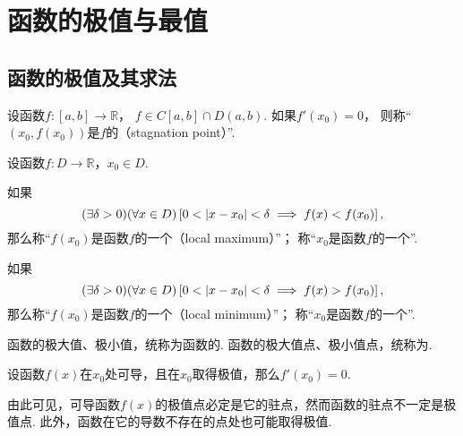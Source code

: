 \section{函数的极值与最值}
\subsection{函数的极值及其求法}
\begin{definition}[驻点]
设函数\(f\colon[a,b]\to\mathbb{R}\)，
\(f \in C[a,b] \cap D(a,b)\).
如果\(f'(x_0)=0\)，
则称“\((x_0,f(x_0))\)是\(f\)的（stagnation point）”.
\end{definition}

\begin{definition}[极值点]
设函数\(f\colon D\to\mathbb{R}\)，\(x_0 \in D\).

如果\[
	(\exists\delta>0)
	(\forall x \in D)
	\left[
		0<\abs{x-x_0}<\delta
		\implies
		f(x)<f(x_0)
	\right],
\]
那么称“\(f(x_0)\)是函数\(f\)的一个（local maximum）”；
称“\(x_0\)是函数\(f\)的一个”.

如果\[
	(\exists\delta>0)
	(\forall x \in D)
	\left[
		0<\abs{x-x_0}<\delta
		\implies
		f(x)>f(x_0)
	\right],
\]
那么称“\(f(x_0)\)是函数\(f\)的一个（local minimum）”；
称“\(x_0\)是函数\(f\)的一个”.

函数的极大值、极小值，统称为函数的.
函数的极大值点、极小值点，统称为.
\end{definition}

\begin{theorem}[函数存在极值的必要条件]\label{theorem:微分中值定理.函数存在极值的必要条件}
设函数\(f(x)\)在\(x_0\)处可导，且在\(x_0\)取得极值，那么\(f'(x_0)=0\).
\end{theorem}
由此可见，可导函数\(f(x)\)的极值点必定是它的驻点，然而函数的驻点不一定是极值点.
此外，函数在它的导数不存在的点处也可能取得极值.

